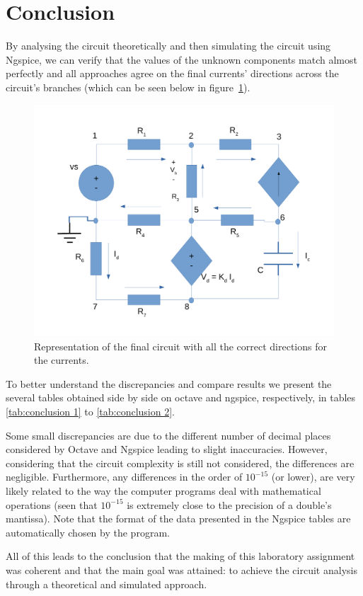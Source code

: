 \newpage
\section{Conclusion}
\label{sec:conclusion}

By analysing the circuit theoretically and then simulating the circuit using Ngspice, we can verify that the values of the unknown components match almost perfectly and all approaches agree on the final currents' directions across the circuit's branches (which can be seen below in figure~\ref{fig:circuit_final}).

\begin{figure}[!ht] \centering
\includegraphics[width=0.8\linewidth]{circuit_final.pdf}
\caption{Representation of the final circuit with all the correct directions for the currents.}
\label{fig:circuit_final}
\end{figure}

To better understand the discrepancies and compare results we present the several tables obtained side by side on octave and ngspice, respectively, in tables \ref{tab:conclusion 1} to \ref{tab:conclusion 2}.





Some small discrepancies are due to the different number of decimal places considered by Octave and Ngspice leading to slight inaccuracies. However, considering that the circuit complexity is still not considered, the differences are negligible. Furthermore, any differences in the order of $10^{-15}$ (or lower), are very likely related to the way the computer programs deal with mathematical operations (seen that $10^{-15}$ is extremely close to the precision of a double's mantissa). Note that the format of the data presented in the Ngspice tables are automatically chosen by the program.

All of this leads to the conclusion that the making of this laboratory assignment was coherent and that the main goal was attained: to achieve the circuit analysis through a theoretical and simulated approach.
